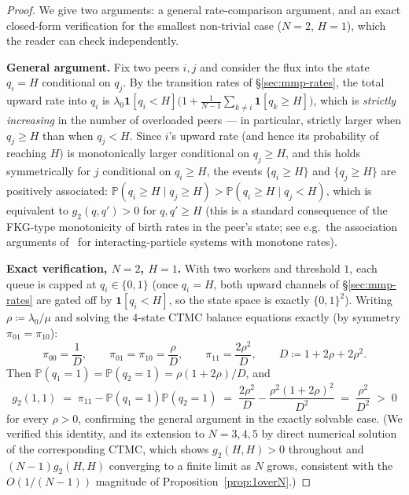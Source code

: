 \documentclass[11pt,a4paper]{article}
\newcommand{\gtwo}{g_2}
\newcommand{\bP}{\mathbb{P}}
\begin{document}
\begin{proof}
We give two arguments: a general rate-comparison argument, and an
exact closed-form verification for the smallest non-trivial case
($N=2$, $H=1$), which the reader can check independently.

\medskip
\noindent\textbf{General argument.} Fix two peers $i,j$ and consider
the flux into the state $q_i = H$ conditional on $q_j$. By the
transition rates of \S\ref{sec:mmp-rates}, the total upward rate into
$q_i$ is $\lambda_0\mathbf{1}[q_i<H]\bigl(1 + \frac{1}{N-1}\sum_{k\neq i}
\mathbf{1}[q_k \geq H]\bigr)$, which is \emph{strictly increasing} in
the number of overloaded peers --- in particular, strictly larger when
$q_j \geq H$ than when $q_j < H$. Since $i$'s upward rate (and hence its
probability of reaching $H$) is monotonically larger conditional on
$q_j \geq H$, and this holds symmetrically for $j$ conditional on
$q_i \geq H$, the events $\{q_i \geq H\}$ and $\{q_j \geq H\}$ are
positively associated: $\bP(q_i \geq H \mid q_j \geq H) >
\bP(q_i \geq H \mid q_j < H)$, which is equivalent to
$\gtwo(q,q') > 0$ for $q,q' \geq H$ (this is a standard consequence of
the FKG-type monotonicity of birth rates in the peer's state; see
e.g.\ the association arguments of~\cite{liggett1985} for
interacting-particle systems with monotone rates).

\medskip
\noindent\textbf{Exact verification, $N=2$, $H=1$.} With two workers
and threshold $1$, each queue is capped at $q_i \in \{0,1\}$ (once
$q_i = H$, both upward channels of \S\ref{sec:mmp-rates} are gated off
by $\mathbf{1}[q_i<H]$, so the state space is exactly
$\{0,1\}^2$). Writing $\rho \coloneqq \lambda_0/\mu$ and solving the
$4$-state CTMC balance equations exactly (by symmetry $\pi_{01}=\pi_{10}$):
\[
  \pi_{00} = \frac{1}{D}, \qquad
  \pi_{01} = \pi_{10} = \frac{\rho}{D}, \qquad
  \pi_{11} = \frac{2\rho^2}{D}, \qquad
  D \coloneqq 1 + 2\rho + 2\rho^2.
\]
Then $\bP(q_1{=}1) = \bP(q_2{=}1) = \rho(1+2\rho)/D$, and
\[
  \gtwo(1,1) \;=\; \pi_{11} - \bP(q_1{=}1)\bP(q_2{=}1)
  \;=\; \frac{2\rho^2}{D} - \frac{\rho^2(1+2\rho)^2}{D^2}
  \;=\; \frac{\rho^2}{D^2}
  \;>\; 0
\]
for every $\rho > 0$, confirming the general argument in the exactly
solvable case. (We verified this identity, and its extension to
$N=3,4,5$ by direct numerical solution of the corresponding CTMC, which
shows $\gtwo(H,H) > 0$ throughout and $(N-1)\gtwo(H,H)$ converging to a
finite limit as $N$ grows, consistent with the $O(1/(N{-}1))$ magnitude
of Proposition~\ref{prop:1overN}.)
\end{proof}
\end{document}
